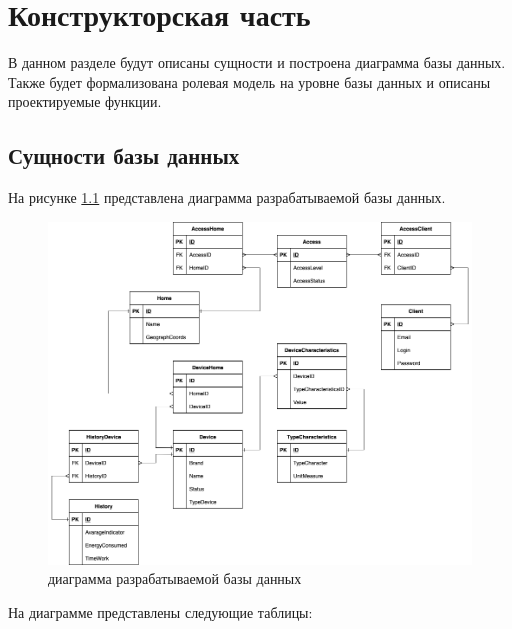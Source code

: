 \chapter{Конструкторская часть}

В данном разделе будут описаны сущности и построена диаграмма базы данных. 
Также будет формализована ролевая модель на уровне базы данных и описаны проектируемые функции.

\section{Сущности базы данных}

На рисунке \ref{img:db} представлена диаграмма разрабатываемой базы данных.

\begin{figure}[h]
    \includegraphics[width=0.9\linewidth]{img/db.png}
    \caption{диаграмма разрабатываемой базы данных}
    \label{img:db}
\end{figure}
\noindent
\clearpage

На диаграмме представлены следующие таблицы:


